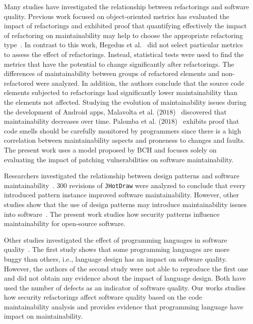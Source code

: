 \documentclass[10pt,conference]{IEEEtran}
\begin{document}
Many studies have investigated the relationship between refactorings and
software quality. Previous work focused on object-oriented metrics has evaluated the
impact of refactorings and exhibited proof that quantifying effectively the
impact of refactoring on maintainability may help to choose the appropriate
refactoring type~\cite{1167822}. In contrast to this work, Hegedus et
al.~\cite{HEGEDUS2018313} did not select particular metrics to assess the effect
of refactorings. Instead, statistical tests were used to find the metrics that
have the potential to change significantly after refactorings. The differences
of maintainability between groups of refactored elements and non-refactored were
analyzed. In addition, the authors conclude that the source code elements
subjected to refactorings had significantly lower maintainability than the
elements not affected. Studying the evolution of maintainability issues during
the development of Android apps, Malavolta et al. ($2018$)~\cite{8530041}
discovered that maintainability decreases over time. Palomba et al.
($2018$)~\cite{Palomba:2018:DIM:3231288.3231337} exhibits proof that code smells
should be carefully monitored by programmers since there is a high correlation
between maintainability aspects and proneness to changes and faults. The present
work uses a model proposed by BCH and focuses solely on evaluating the impact of
patching vulnerabilities on software maintainability.

Researchers investigated the relationship between design patterns and software
maintainability~\cite{10.1007/978-3-642-35267-6-18}. $300$ revisions of
\texttt{JHotDraw} were analyzed to conclude that every introduced pattern
instance improved software maintainability. However, other studies show that the
use of design patterns may introduce maintainability issues into
software~\cite{4493325}. The present work studies how security patterns
influence maintainability for open-source software.

Other studies investigated the effect of programming languages in software
quality~\cite{Ray:2017:LSP:3144574.3126905, 2019arXiv190110220B}. The first
study shows that some programming languages are more buggy than others, i.e.,
language design has an impact on software quality. However, the authors of the
second study were not able to reproduce the first one and did not obtain any
evidence about the impact of language design. Both have used the number of
defects as an indicator of software quality. Our works studies how
security refactorings affect software quality based on the code maintainability
analysis and provides evidence that programming language have impact on
maintainability.
\end{document}
